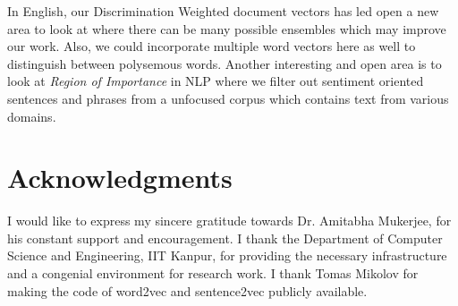 \documentclass[11pt,a4paper]{article}
\begin{document}
In English, our Discrimination Weighted document vectors has led open a new area to look at where there can be many possible ensembles which may improve our work. Also, we could incorporate multiple word vectors here as well to distinguish between polysemous words. Another interesting and open area is to look at \emph{Region of Importance} in NLP where we filter out sentiment oriented sentences and phrases from a unfocused corpus which contains text from various domains.

\section*{Acknowledgments}
I would like to express my sincere gratitude towards Dr. Amitabha Mukerjee, for his  constant support and encouragement. I thank the Department of Computer Science and Engineering, IIT Kanpur, for providing the necessary infrastructure and a congenial environment for research work. I thank Tomas Mikolov for making the code of word2vec and sentence2vec publicly available.



\end{document}
